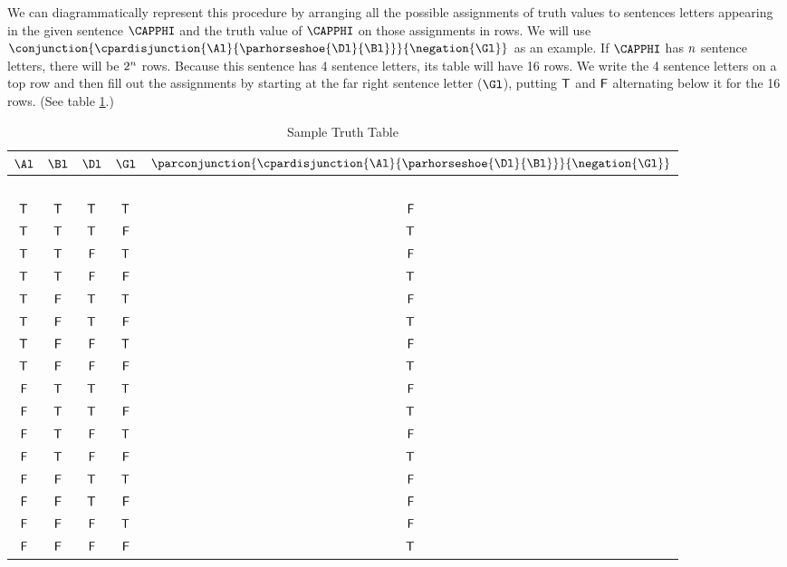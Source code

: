We can diagrammatically represent this procedure by arranging all the possible assignments of truth values to sentences letters appearing in the given sentence $\CAPPHI$ and the truth value of $\CAPPHI$ on those assignments in rows. 
We will use $\conjunction{\cpardisjunction{\Al}{\parhorseshoe{\Dl}{\Bl}}}{\negation{\Gl}}$ as an example. 
If $\CAPPHI$ has $n$ sentence letters, there will be $2^{n}$ rows. 
Because this sentence has 4 sentence letters, its table will have 16 rows. 
We write the 4 sentence letters on a top row and then fill out the assignments by starting at the far right sentence letter ($\Gl$), putting $\mathsf{T}$ and $\mathsf{F}$ alternating below it for the 16 rows. (See table \ref{truthtableexample}.) 
\begin{table}[!ht]
\begin{center}
\begin{tabular}{ c c c c c}
$\Al$ & $\Bl$ & $\Dl$ & $\Gl$ & $\parconjunction{\cpardisjunction{\Al}{\parhorseshoe{\Dl}{\Bl}}}{\negation{\Gl}}$ \\
\hline
$ $ & $ $ & & & \\[-.25cm]
$\mathsf{T}$ & $\mathsf{T}$ & $\mathsf{T}$ & $\mathsf{T}$ & $\mathsf{F}$ \\
$\mathsf{T}$ & $\mathsf{T}$ & $\mathsf{T}$ & $\mathsf{F}$& $\mathsf{T}$ \\
$\mathsf{T}$ & $\mathsf{T}$ & $\mathsf{F}$ & $\mathsf{T}$ & $\mathsf{F}$ \\
$\mathsf{T}$ & $\mathsf{T}$ & $\mathsf{F}$ & $\mathsf{F}$  & $\mathsf{T}$ \\
$\mathsf{T}$ &  $\mathsf{F}$& $\mathsf{T}$ & $\mathsf{T}$	&$\mathsf{F}$ \\
$\mathsf{T}$ & $\mathsf{F}$ & $\mathsf{T}$ & $\mathsf{F}$	& $\mathsf{T}$  \\
$\mathsf{T}$ &$\mathsf{F}$  & $\mathsf{F}$& $\mathsf{T}$	&$\mathsf{F}$ \\
$\mathsf{T}$ & $\mathsf{F}$ &$\mathsf{F}$	& $\mathsf{F}$	& $\mathsf{T}$ \\
$\mathsf{F}$	& $\mathsf{T}$ & $\mathsf{T}$ & $\mathsf{T}$	& $\mathsf{F}$ \\
$\mathsf{F}$	& $\mathsf{T}$ & $\mathsf{T}$ & $\mathsf{F}$	& $\mathsf{T}$ \\
$\mathsf{F}$	& $\mathsf{T}$ & $\mathsf{F}$&	$\mathsf{T}$ &$\mathsf{F}$ \\
$\mathsf{F}$	& $\mathsf{T}$ & $\mathsf{F}$& $\mathsf{F}$	& $\mathsf{T}$ \\
$\mathsf{F}$	& $\mathsf{F}$	& $\mathsf{T}$ & $\mathsf{T}$	&$\mathsf{F}$ \\
$\mathsf{F}$	& $\mathsf{F}$	& $\mathsf{T}$ & $\mathsf{F}$	& $\mathsf{F}$ \\
$\mathsf{F}$	& $\mathsf{F}$	& $\mathsf{F}$& $\mathsf{T}$	& $\mathsf{F}$ \\
$\mathsf{F}$	& $\mathsf{F}$& $\mathsf{F}$& $\mathsf{F}$	& $\mathsf{T}$ \\
\end{tabular}
\end{center}
\caption{Sample Truth Table}
\label{truthtableexample}
\end{table}
